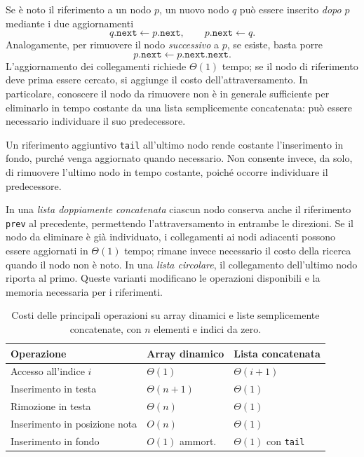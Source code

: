 Se è noto il riferimento a un nodo \(p\), un nuovo nodo \(q\)
può essere inserito \emph{dopo} \(p\) mediante i due aggiornamenti
\[
  q.\texttt{next}\gets p.\texttt{next},
  \qquad p.\texttt{next}\gets q.
\]
Analogamente, per rimuovere il nodo \emph{successivo} a \(p\),
se esiste, basta porre
\[
  p.\texttt{next}\gets p.\texttt{next.next}.
\]
L'aggiornamento dei collegamenti richiede \(\Theta(1)\) tempo;
se il nodo di riferimento deve prima essere cercato, si aggiunge
il costo dell'attraversamento. In particolare, conoscere il nodo
da rimuovere non è in generale sufficiente per eliminarlo in
tempo costante da una lista semplicemente concatenata: può
essere necessario individuare il suo predecessore.

Un riferimento aggiuntivo \texttt{tail} all'ultimo nodo rende
costante l'inserimento in fondo, purché venga aggiornato quando
necessario. Non consente invece, da solo, di rimuovere l'ultimo
nodo in tempo costante, poiché occorre individuare il predecessore.

In una \emph{lista doppiamente concatenata} ciascun nodo conserva
anche il riferimento \texttt{prev} al precedente, permettendo
l'attraversamento in entrambe le direzioni. Se il nodo da
eliminare è già individuato, i collegamenti ai nodi adiacenti
possono essere aggiornati in \(\Theta(1)\) tempo; rimane invece
necessario il costo della ricerca quando il nodo non è noto.
In una \emph{lista circolare}, il collegamento dell'ultimo nodo
riporta al primo. Queste varianti modificano le operazioni
disponibili e la memoria necessaria per i riferimenti.

\begin{table}[htbp]
  \centering
  \caption{Costi delle principali operazioni su array dinamici
  e liste semplicemente concatenate, con \(n\) elementi
  e indici da zero.}
  \label{tab:fi-array-concatenata-costi}
  \small
  \begin{tabular}{lll}
    \hline
    Operazione & Array dinamico & Lista concatenata\\
    \hline
    Accesso all'indice \(i\) & \(\Theta(1)\) & \(\Theta(i+1)\)\\
    Inserimento in testa & \(\Theta(n+1)\) & \(\Theta(1)\)\\
    Rimozione in testa & \(\Theta(n)\) & \(\Theta(1)\)\\
    Inserimento in posizione nota & \(O(n)\) & \(\Theta(1)\)\\
    Inserimento in fondo & \(O(1)\) ammort. & \(\Theta(1)\) con \texttt{tail}\\
    \hline
  \end{tabular}
\end{table}

